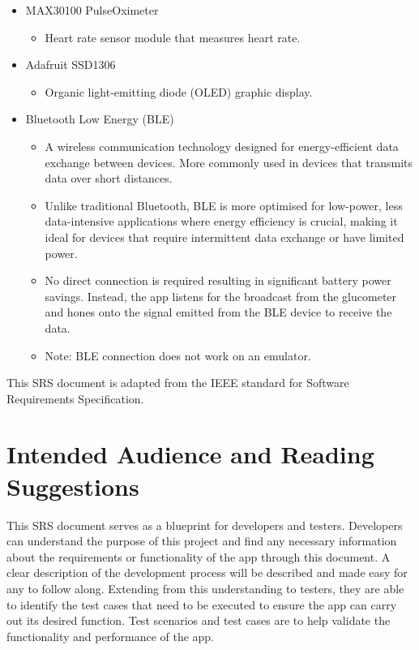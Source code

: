 \documentclass[a4paper]{scrreprt}
\begin{document}
\begin{itemize}
    \item MAX30100 PulseOximeter
    \begin{itemize}
        \item Heart rate sensor module that measures heart rate.
    \end{itemize}

    \item Adafruit SSD1306
    \begin{itemize}
        \item Organic light-emitting diode (OLED) graphic display.
    \end{itemize}

    \item Bluetooth Low Energy (BLE)
    \begin{itemize}
        \item A wireless communication technology designed for energy-efficient data exchange between devices. More commonly used in devices that transmits data over short distances.
        \item Unlike traditional Bluetooth, BLE is more optimised for low-power, less data-intensive applications where energy efficiency is crucial, making it ideal for devices that require intermittent data exchange or have limited power.
        \item No direct connection is required resulting in significant battery power savings. Instead, the app listens for the broadcast from the glucometer and hones onto the signal emitted from the BLE device to receive the data.
        \item Note: BLE connection does not work on an emulator.
    \end{itemize}
    \end{itemize}
This SRS document is adapted from the IEEE standard for Software Requirements Specification.


\section{Intended Audience and Reading Suggestions}
This SRS document serves as a blueprint for developers and testers.
\newline
Developers can understand the purpose of this project and find any necessary information about the requirements or functionality of the app through this document. A clear description of the development process will be described and made easy for any to follow along.
\newline
Extending from this understanding to testers, they are able to identify the test cases that need to be executed to ensure the app can carry out its desired function. Test scenarios and test cases are to help validate the functionality and performance of the app.
\end{document}
